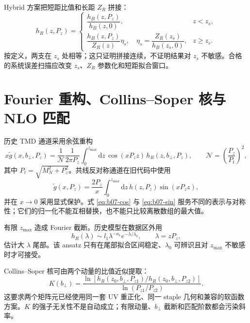 Hybrid 方案把短距比值和长距 $Z_R$ 拼接：
\begin{equation}
  h_R(z,P_z)=
  \begin{cases}
  \dfrac{h_B(z,P_z)}{h_B(z,0)},&z<z_s,\\[7pt]
  \dfrac{h_B(z,P_z)}{Z_R(z)}\eta_s,
  \quad \eta_s=\dfrac{Z_R(z_s)}{h_B(z_s,0)},&z\ge z_s.
  \end{cases}
  \label{eq:b07-hybrid}
\end{equation}
按定义，两支在 $z_s$ 处相等；这只证明拼接连续，不证明结果对 $z_s$ 不敏感。合格的系统误差扫描应改变 $z_s$、$Z_R$ 参数化和短距拟合窗口。

\section{Fourier 重构、Collins--Soper 核与 NLO 匹配}

历史 TMD 通道采用余弦重构
\begin{equation}
  x\tilde g(x,b_\perp,P_z)
  =\frac{1}{\mathcal N}\frac{1}{2\pi P_z}
  \int_0^{z_{\max}}\mathrm dz\,
  \cos(xP_zz)\,h_R(z,b_\perp,P_z),
  \qquad
  \mathcal N=\left(\frac{P_z}{P_t}\right)^2,
  \label{eq:b07-cos}
\end{equation}
其中 $P_t=\sqrt{M_N^2+P_z^2}$。共线反对称通道在旧代码中使用
\begin{equation}
  \tilde g(x,P_z)=\frac{2P_z}{x}
  \int_0^{z_{\max}}\mathrm dz\,
  h(z,P_z)\sin(xP_zz),
  \label{eq:b07-sin}
\end{equation}
并在 $x\to0$ 采用显式保护。式 \eqref{eq:b07-cos} 与 \eqref{eq:b07-sin} 服务不同的表示与对称性；它们的归一化不能互相替换，也不能只比较离散数组的最大值。

有限 $z_{\max}$ 造成 Fourier 截断。历史模型在数据区外用
\begin{equation}
  h_R(\lambda)\sim l_1\lambda^{-a_1}e^{-\lambda/\lambda_0},
  \qquad \lambda=zP_z,
  \label{eq:b07-tail}
\end{equation}
估计大 $\lambda$ 尾部。该 ansatz 只有在尾部拟合区间稳定、$\lambda_0$ 可辨识且对 $z_{\max}$ 不敏感时才可接受。

Collins--Soper 核可由两个动量的比值近似提取：
\begin{equation}
  K(b_\perp)=
  \frac{\ln[h_R(z_0,b_\perp,P_{z1})/h_R(z_0,b_\perp,P_{z2})]}
  {\ln(P_{z1}/P_{z2})}.
  \label{eq:b07-cs}
\end{equation}
这要求两个矩阵元已经使用同一套 UV 重正化、同一 staple 几何和兼容的软函数方案。$K$ 的强子无关性不是自动成立；有限动量、$b_\perp$ 截断和匹配阶数都会污染斜率。

